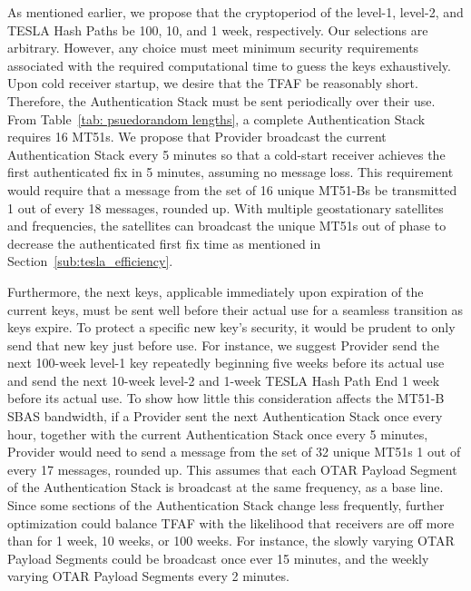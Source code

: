 \documentclass[letterpaper,times]{IONconf/IONconf}
\begin{document}
		As mentioned earlier, we propose that the cryptoperiod of the level-1, level-2, and TESLA Hash Paths be 100, 10, and 1 week, respectively.
		Our selections are arbitrary.
		However,  any choice must meet minimum security requirements associated with the required computational time to guess the keys exhaustively.
		Upon cold receiver startup, we desire that the TFAF be reasonably short.
		Therefore, the Authentication Stack must be sent periodically over their use.
		From Table~\ref{tab: psuedorandom lengths}, a complete Authentication Stack requires 16 MT51s. 
		We propose that Provider broadcast the current Authentication Stack every 5 minutes so that a cold-start receiver achieves the first authenticated fix in 5 minutes, assuming no message loss.
		This requirement would require that a message from the set of 16 unique MT51-Bs be transmitted 1 out of every 18 messages, rounded up.
		With multiple geostationary satellites and frequencies, the satellites can broadcast the unique MT51s out of phase to decrease the authenticated first fix time as mentioned in Section~\ref{sub:tesla_efficiency}.

		Furthermore, the next keys, applicable immediately upon expiration of the current keys, must be sent well before their actual use for a seamless transition as keys expire.
		To protect a specific new key's security, it would be prudent to only send that new key just before use.
		For instance, we suggest Provider send the next 100-week level-1 key repeatedly beginning five weeks before its actual use and send the next 10-week level-2 and 1-week TESLA Hash Path End 1 week before its actual use.
		To show how little this consideration affects the MT51-B SBAS bandwidth, if a Provider sent the next Authentication Stack once every hour, together with the current Authentication Stack once every 5 minutes, Provider would need to send a message from the set of 32 unique MT51s 1 out of every 17 messages, rounded up.
		This assumes that each OTAR Payload Segment of the Authentication Stack is broadcast at the same frequency, as a base line.
		Since some sections of the Authentication Stack change less frequently, further optimization could balance TFAF with the likelihood that receivers are off more than for 1 week, 10 weeks, or 100 weeks.
		For instance, the slowly varying OTAR Payload Segments could be broadcast once ever 15 minutes, and the weekly varying OTAR Payload Segments every 2 minutes.
\end{document}
